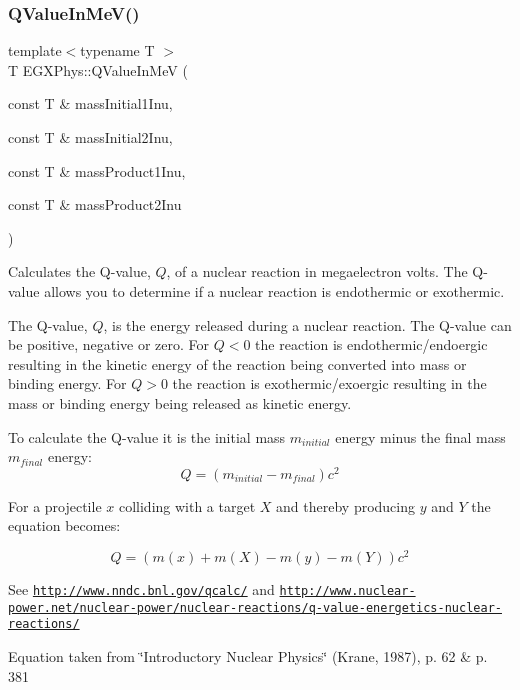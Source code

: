 \subsubsection{\texorpdfstring{Q\+Value\+In\+Me\+V()}{QValueInMeV()}}
{\footnotesize\ttfamily template$<$typename T $>$ \\
T E\+G\+X\+Phys\+::\+Q\+Value\+In\+MeV (\begin{DoxyParamCaption}\item[{const T \&}]{mass\+Initial1\+Inu,  }\item[{const T \&}]{mass\+Initial2\+Inu,  }\item[{const T \&}]{mass\+Product1\+Inu,  }\item[{const T \&}]{mass\+Product2\+Inu }\end{DoxyParamCaption})}



Calculates the Q-\/value, $Q$, of a nuclear reaction in megaelectron volts. The Q-\/value allows you to determine if a nuclear reaction is endothermic or exothermic. 

The Q-\/value, $Q$, is the energy released during a nuclear reaction. The Q-\/value can be positive, negative or zero. For $Q < 0$ the reaction is endothermic/endoergic resulting in the kinetic energy of the reaction being converted into mass or binding energy. For $Q > 0$ the reaction is exothermic/exoergic resulting in the mass or binding energy being released as kinetic energy.

To calculate the Q-\/value it is the initial mass $m_{initial}$ energy minus the final mass $m_{final}$ energy\+: \[Q = \left ( m_{initial}-m_{final}\right ) c^2\]

For a projectile $x$ colliding with a target $X$ and thereby producing $y$ and $Y$ the equation becomes\+:

\[Q = \left ( m(x) + m (X) - m(y) - m(Y) \right ) c^2\]

See \href{http://www.nndc.bnl.gov/qcalc/}{\tt http\+://www.\+nndc.\+bnl.\+gov/qcalc/} and \href{http://www.nuclear-power.net/nuclear-power/nuclear-reactions/q-value-energetics-nuclear-reactions/}{\tt http\+://www.\+nuclear-\/power.\+net/nuclear-\/power/nuclear-\/reactions/q-\/value-\/energetics-\/nuclear-\/reactions/}

Equation taken from \char`\"{}\+Introductory Nuclear Physics\char`\"{} (Krane, 1987), p. 62 \& p. 381


